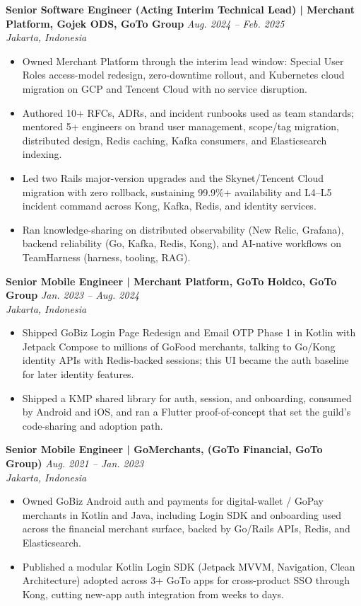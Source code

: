 \documentclass[10pt]{article}
\begin{document}
{\vspace{4pt}
\textbf{Senior Software Engineer (Acting Interim Technical Lead) | Merchant Platform, Gojek ODS, GoTo Group} \hfill \textit{Aug. 2024 -- Feb. 2025}\\
\textit{Jakarta, Indonesia}
\begin{itemize}
\item Owned Merchant Platform through the interim lead window: Special User Roles access-model redesign, zero-downtime rollout, and Kubernetes cloud migration on GCP and Tencent Cloud with no service disruption.
\item Authored 10+ RFCs, ADRs, and incident runbooks used as team standards; mentored 5+ engineers on brand user management, scope/tag migration, distributed design, Redis caching, Kafka consumers, and Elasticsearch indexing.
\item Led two Rails major-version upgrades and the Skynet/Tencent Cloud migration with zero rollback, sustaining 99.9\%+ availability and L4--L5 incident command across Kong, Kafka, Redis, and identity services.
\item Ran knowledge-sharing on distributed observability (New Relic, Grafana), backend reliability (Go, Kafka, Redis, Kong), and AI-native workflows on TeamHarness (harness, tooling, RAG).
\end{itemize}

\vspace{4pt}
\textbf{Senior Mobile Engineer | Merchant Platform, GoTo Holdco, GoTo Group} \hfill \textit{Jan. 2023 -- Aug. 2024}\\
\textit{Jakarta, Indonesia}
\begin{itemize}
\item Shipped GoBiz Login Page Redesign and Email OTP Phase 1 in Kotlin with Jetpack Compose to millions of GoFood merchants, talking to Go/Kong identity APIs with Redis-backed sessions; this UI became the auth baseline for later identity features.
\item Shipped a KMP shared library for auth, session, and onboarding, consumed by Android and iOS, and ran a Flutter proof-of-concept that set the guild's code-sharing and adoption path.
\end{itemize}

\vspace{4pt}
\textbf{Senior Mobile Engineer | GoMerchants, (GoTo Financial, GoTo Group)} \hfill \textit{Aug. 2021 -- Jan. 2023}\\
\textit{Jakarta, Indonesia}
\begin{itemize}
\item Owned GoBiz Android auth and payments for digital-wallet / GoPay merchants in Kotlin and Java, including Login SDK and onboarding used across the financial merchant surface, backed by Go/Rails APIs, Redis, and Elasticsearch.
\item Published a modular Kotlin Login SDK (Jetpack MVVM, Navigation, Clean Architecture) adopted across 3+ GoTo apps for cross-product SSO through Kong, cutting new-app auth integration from weeks to days.
\end{itemize}

}
\end{document}
